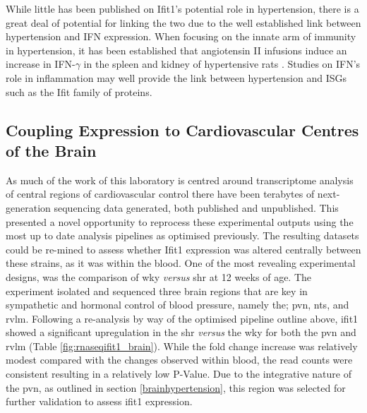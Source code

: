 While little has been published on Ifit1's potential role in hypertension, there is a great deal of potential for linking the two due to the well established link between hypertension and IFN expression. When focusing on the innate arm of immunity in hypertension, it has been established that angiotensin II infusions induce an increase in IFN-$\gamma$ in the spleen and kidney of hypertensive rats \cite{Shao2003}. Studies on IFN's role in inflammation may well provide the link between hypertension and ISGs such as the Ifit family of proteins.


\subsection{Coupling Expression to Cardiovascular Centres of the Brain}

As much of the work of this laboratory is centred around transcriptome analysis of central regions of cardiovascular control there have been terabytes of next-generation sequencing data generated, both published and unpublished. This presented a novel opportunity to reprocess these experimental outputs using the most up to date analysis pipelines as optimised previously. The resulting datasets could be re-mined to assess whether Ifit1 expression was altered centrally between these strains, as it was within the blood. One of the most revealing experimental designs, was the comparison of \acrshort{wky} \textit{versus} \acrshort{shr} at 12 weeks of age. The experiment isolated and sequenced three brain regions that are key in sympathetic and hormonal control of blood pressure, namely the; \acrfull{pvn}, \acrfull{nts}, and \acrfull{rvlm}. Following a re-analysis by way of the optimised pipeline outline above, \acrshort{ifit1} showed a significant upregulation in the \acrshort{shr} \textit{versus} the \acrshort{wky} for both the \acrshort{pvn} and \acrshort{rvlm} (Table \ref{fig:rnaseqifit1_brain}). While the fold change increase was relatively modest compared with the changes observed within blood, the read counts were consistent resulting in a relatively low P-Value. Due to the integrative nature of the \acrshort{pvn}, as outlined in section \ref{brainhypertension}, this region was selected for further validation to assess \acrshort{ifit1} expression. \\

